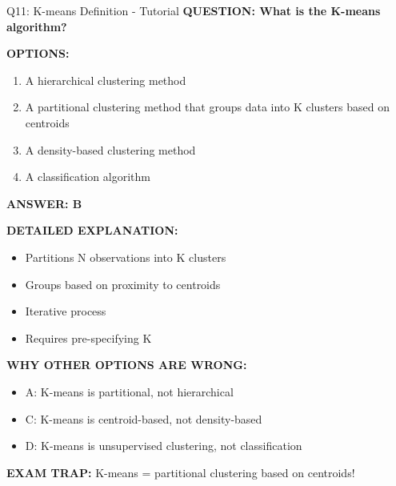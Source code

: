 \documentclass[8pt]{beamer}
\begin{document}
	\begin{frame}{Q11: K-means Definition - Tutorial}
		\fontsize{6.5}{7.5}\selectfont
		\textbf{QUESTION: What is the K-means algorithm?}
		
		\vspace{0.1cm}
		\textbf{OPTIONS:}
		\begin{enumerate}
			\item A hierarchical clustering method
			\item A partitional clustering method that groups data into K clusters based on centroids
			\item A density-based clustering method
			\item A classification algorithm
		\end{enumerate}
		
		\vspace{0.1cm}
		\textcolor{myblue}{\textbf{ANSWER: B}}
		
		\vspace{0.1cm}
		\textbf{DETAILED EXPLANATION:}
		\begin{itemize}
			\item Partitions N observations into K clusters
			\item Groups based on proximity to centroids
			\item Iterative process
			\item Requires pre-specifying K
		\end{itemize}
		
		\vspace{0.1cm}
		\textcolor{myred}{\textbf{WHY OTHER OPTIONS ARE WRONG:}}
		\begin{itemize}
			\item \textcolor{myred}{A:} K-means is partitional, not hierarchical
			\item \textcolor{myred}{C:} K-means is centroid-based, not density-based
			\item \textcolor{myred}{D:} K-means is unsupervised clustering, not classification
		\end{itemize}
		
		\textcolor{myred}{\textbf{EXAM TRAP:}} K-means = \textcolor{myblue}{partitional clustering based on centroids}!
	\end{frame}
	
\end{document}
